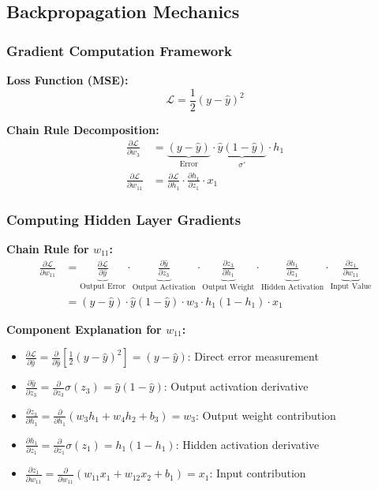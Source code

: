 \documentclass[5pt,aspectratio=169]{beamer}
\begin{document}
\subsection{Backpropagation Mechanics}
\begin{frame}
\frametitle{Gradient Computation Framework}

\textbf{Loss Function (MSE):}
\[
\mathcal{L} = \frac{1}{2}(y - \hat{y})^2
\]

\textbf{Chain Rule Decomposition:}
\begin{align*}
\frac{\partial \mathcal{L}}{\partial w_3} &= \underbrace{(y - \hat{y})}_{\text{Error}} \cdot \underbrace{\hat{y}(1-\hat{y})}_{\sigma'} \cdot h_1 \\
\frac{\partial \mathcal{L}}{\partial w_{11}} &= \frac{\partial \mathcal{L}}{\partial h_1} \cdot \frac{\partial h_1}{\partial z_1} \cdot x_1 
\end{align*}
\end{frame}

\begin{frame}
\frametitle{Computing Hidden Layer Gradients}

\textbf{Chain Rule for $w_{11}$:}
\begin{align*}
\frac{\partial \mathcal{L}}{\partial w_{11}} &= 
\underbrace{\frac{\partial \mathcal{L}}{\partial \hat{y}}}_{\text{Output Error}} 
\cdot \underbrace{\frac{\partial \hat{y}}{\partial z_3}}_{\text{Output Activation}} 
\cdot \underbrace{\frac{\partial z_3}{\partial h_1}}_{\text{Output Weight}} 
\cdot \underbrace{\frac{\partial h_1}{\partial z_1}}_{\text{Hidden Activation}} 
\cdot \underbrace{\frac{\partial z_1}{\partial w_{11}}}_{\text{Input Value}} \\
&= (y - \hat{y}) \cdot \hat{y}(1-\hat{y}) \cdot w_3 \cdot h_1(1-h_1) \cdot x_1
\end{align*}

\textbf{Component Explanation for $w_{11}$:}
{\footnotesize
\begin{itemize}
\item $\frac{\partial \mathcal{L}}{\partial \hat{y}} = \frac{\partial}{\partial \hat{y}} [\frac{1}{2}(y - \hat{y})^2] = (y - \hat{y})$: Direct error measurement
\item $\frac{\partial \hat{y}}{\partial z_3} = \frac{\partial}{\partial z_3} \sigma(z_3) = \hat{y}(1-\hat{y})$: Output activation derivative
\item $\frac{\partial z_3}{\partial h_1} = \frac{\partial}{\partial h_1} (w_3h_1 + w_4h_2 + b_3) = w_3$: Output weight contribution
\item $\frac{\partial h_1}{\partial z_1} = \frac{\partial}{\partial z_1} \sigma(z_1) = h_1(1-h_1)$: Hidden activation derivative
\item $\frac{\partial z_1}{\partial w_{11}} = \frac{\partial}{\partial w_{11}} (w_{11}x_1 + w_{12}x_2 + b_1) = x_1$: Input contribution
\end{itemize}
}

\end{frame}
\end{document}
